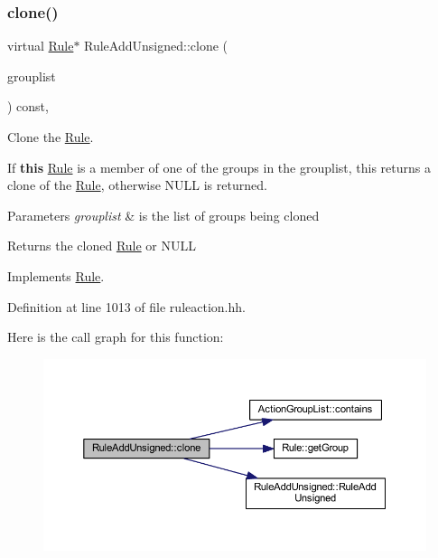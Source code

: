 \subsubsection{\texorpdfstring{clone()}{clone()}}
{\footnotesize\ttfamily virtual \mbox{\hyperlink{class_rule}{Rule}}$\ast$ Rule\+Add\+Unsigned\+::clone (\begin{DoxyParamCaption}\item[{const \mbox{\hyperlink{class_action_group_list}{Action\+Group\+List}} \&}]{grouplist }\end{DoxyParamCaption}) const\hspace{0.3cm}{\ttfamily [inline]}, {\ttfamily [virtual]}}



Clone the \mbox{\hyperlink{class_rule}{Rule}}. 

If {\bfseries{this}} \mbox{\hyperlink{class_rule}{Rule}} is a member of one of the groups in the grouplist, this returns a clone of the \mbox{\hyperlink{class_rule}{Rule}}, otherwise N\+U\+LL is returned. 
\begin{DoxyParams}{Parameters}
{\em grouplist} & is the list of groups being cloned \\
\hline
\end{DoxyParams}
\begin{DoxyReturn}{Returns}
the cloned \mbox{\hyperlink{class_rule}{Rule}} or N\+U\+LL 
\end{DoxyReturn}


Implements \mbox{\hyperlink{class_rule_a70de90a76461bfa7ea0b575ce3c11e4d}{Rule}}.



Definition at line 1013 of file ruleaction.\+hh.

Here is the call graph for this function\+:
\nopagebreak
\begin{figure}[H]
\begin{center}
\leavevmode
\includegraphics[width=350pt]{class_rule_add_unsigned_a6cb39fff450ccb1e748e5d5fd2b6f110_cgraph}
\end{center}
\end{figure}
\mbox{\label{class_rule_add_unsigned_aeea5c9fac04c1f37c830e36e28117cd1}} 
